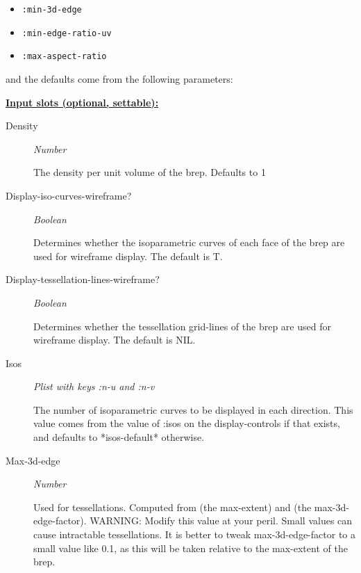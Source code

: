 \documentclass [11pt]{book}
\begin{document}
\begin{itemize}
\begin{description}
\begin{itemize}
\item \texttt{:min-3d-edge}

\item \texttt{:min-edge-ratio-uv}

\item \texttt{:max-aspect-ratio}

\end{itemize}

\texttt{}
and the defaults come from the following parameters:



\end{description}






\textbf{
\underline{Input slots (optional, settable):}}

\begin{description}

\item [Density]
\emph{Number}

 The density per unit volume of the brep. Defaults to 1




\item [Display-iso-curves-wireframe?]
\emph{Boolean}

 Determines whether the isoparametric curves of each face of the brep are used for wireframe display.
The default is T.




\item [Display-tessellation-lines-wireframe?]
\emph{Boolean}

 Determines whether the tessellation grid-lines of the brep are used for wireframe display.
The default is NIL.




\item [Isos]
\emph{Plist with keys :n-u and :n-v}

 The number of isoparametric curves to be displayed in each direction.
This value comes from the value of :isos on the display-controls if that exists, and defaults
to *isos-default* otherwise.




\item [Max-3d-edge]
\emph{Number}

 Used for tessellations. Computed from (the max-extent) and (the max-3d-edge-factor).
WARNING: Modify this value at your peril. Small values can cause intractable tessellations.
It is better to tweak max-3d-edge-factor to a small value like 0.1, as this will
be taken relative to the max-extent of the brep.





\end{description}
\end{itemize}
\end{document}
